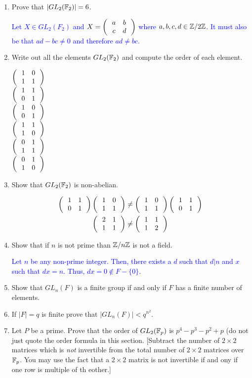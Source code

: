 \documentclass[10pt,a4paper]{report}
\newcommand{\BLUE}[1]{\textcolor{blue}{#1}}
\begin{document}
\begin{enumerate}

\item Prove that $|GL_2(\mathbb{F}_2)| =6$.

\BLUE{Let $X \in GL_2(F_2)$ and $X=\left (\,  \begin{array}{c c} a&b \\ c & d \end{array}  \,\right )$ where $a,b,c,d \in \mathbb{Z}/2\mathbb{Z}$.  It must also be that $ad-bc \ne 0$ and therefore $ad\ne bc$.  
}

\item Write out all the elements $GL_2(\mathbb{F}_2)$ and compute the order of each element.

\BLUE{
$\left (\,  \begin{array}{c c} 1&0 \\ 1 & 1 \end{array}  \,\right )$\\
$\left (\,  \begin{array}{c c} 1&1 \\ 0 & 1 \end{array}  \,\right )$\\
$\left (\,  \begin{array}{c c} 1&0 \\ 0 & 1 \end{array}  \,\right )$\\
$\left (\,  \begin{array}{c c} 1&1 \\ 1 & 0 \end{array}  \,\right )$\\
$\left (\,  \begin{array}{c c} 0&1 \\ 1 & 1 \end{array}  \,\right )$\\
$\left (\,  \begin{array}{c c} 0&1 \\ 1 & 0 \end{array}  \,\right )$\\
}

\item Show that $GL_2(\mathbb{F}_2)$ is non-abelian.

\BLUE{
\begin{align*}
	\left (\,  \begin{array}{c c} 1&1 \\ 0 & 1 \end{array}  \,\right )\left (\,  \begin{array}{c c} 1&0 \\ 1 & 1 \end{array}  \,\right ) & \ne \left (\,  \begin{array}{c c} 1&0 \\ 1 & 1 \end{array}  \,\right )\left (\,  \begin{array}{c c} 1&1 \\ 0 & 1 \end{array}  \,\right ) \\
	\left (\,  \begin{array}{c c} 2&1 \\ 1 & 1 \end{array}  \,\right ) &\ne \left (\,  \begin{array}{c c} 1&1 \\ 1 & 2 \end{array}  \,\right )
\end{align*}
}

\item Show that if $n$ is not prime than $\mathbb{Z}/n\mathbb{Z}$ is not a field.

\BLUE{Let $n$ be any non-prime integer.  Then, there exists a $d$ such that $d|n$ and $x$ such that $dx=n$. Thus, $dx=0 \not \in F - \{0\}$.
}

\item Show that $GL_n(F)$ is a finite group if and only if $F$ has a finite number of elements.

\item If $|F|=q$ is finite prove that $|GL_n(F)| < q^{n^2}$.

\item Let $P$ be a prime.  Prove that the order of $GL_2(\mathbb{F}_p)$ is $p^4-p^3-p^2+p$ (do not just quote the order formula in this section. [Subtract the number of $2 \times 2$ matrices which is \textit{not} invertible from the total number of $2\times 2$ matrices over $\mathbb{F}_p$.  You may use the fact that a $2\times 2$ matrix is not invertible if and ony if one row is multiple of th eother.]


\end{enumerate}
\end{document}
